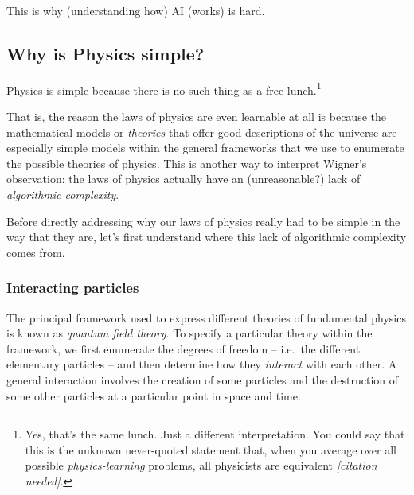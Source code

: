 \documentclass[12pt]{article}
\begin{document}
This is why (understanding how) AI (works) is hard.


















\subsection{Why is Physics simple?}\label{sec:physics-simple}




\noindent{}Physics is simple because there is no such thing as a free lunch.\footnote{Yes, that's the same lunch. Just a different interpretation. You could say that this is the unknown never-quoted statement 
that, when you average over all possible \emph{physics-learning} problems, 
all physicists are equivalent \emph{[citation needed]}.
}





That is, the reason the laws of physics are even learnable at all is because the mathematical models or \emph{theories} that offer good descriptions of the universe are especially simple models within the general frameworks that we use to enumerate the possible theories of physics. 
This is another way to interpret Wigner's observation: the laws of physics actually have an (unreasonable?) lack of \emph{algorithmic complexity}. 

Before directly addressing why our laws of physics really had to be simple in the way that they are, let's first understand where this lack of algorithmic complexity comes from. 


\subsubsection*{Interacting particles}


The principal framework used to express different theories of fundamental physics is known as
\emph{quantum field theory}. %
To specify a particular theory within the framework, we first enumerate the 
degrees of freedom -- i.e.~the different elementary particles -- and then determine how they \emph{interact} with each other. 
A general interaction involves the creation of some particles and the destruction of some other particles at a particular point in space and time.
\end{document}

